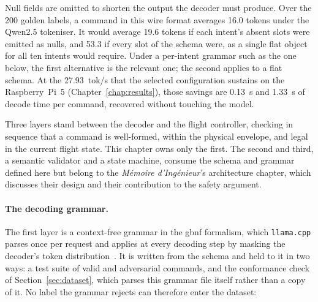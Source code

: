 Null fields are omitted to shorten the output the decoder must produce. Over the 200 golden labels,
a command in this wire format averages 16.0 tokens under the Qwen2.5 tokeniser. It would average
19.6 tokens if each intent's absent slots were emitted as nulls, and 53.3 if every slot of the
schema were, as a single flat object for all ten intents would require. Under a per-intent grammar
such as the one below, the first alternative is the relevant one; the second applies to a flat
schema. At the 27.93~tok/s that the
selected configuration sustains on the Raspberry~Pi~5 (Chapter~\ref{chap:results}), those savings
are 0.13~s and 1.33~s of decode time per command, recovered without touching the model.

Three layers stand between the decoder and the flight controller, checking in sequence that a
command is well-formed, within the physical envelope, and legal in the current flight state. This
chapter owns only the first. The second and third, a semantic validator and a state machine, consume
the schema and grammar defined here but belong to the \emph{M\'emoire d'Ing\'enieur}'s architecture
chapter, which discusses their design and their contribution to the safety argument.

\paragraph{The decoding grammar.} The first layer is a context-free grammar in the \gls{gbnf}
formalism, which \texttt{llama.cpp} parses once per request and applies at every decoding step by
masking the decoder's token distribution~\cite{llamacpp}. It is written from the schema and held to
it in two ways: a test suite of valid and adversarial commands, and the conformance check of
Section~\ref{sec:dataset}, which parses this grammar file itself rather than a copy of it. No label
the grammar rejects can therefore enter the dataset:

